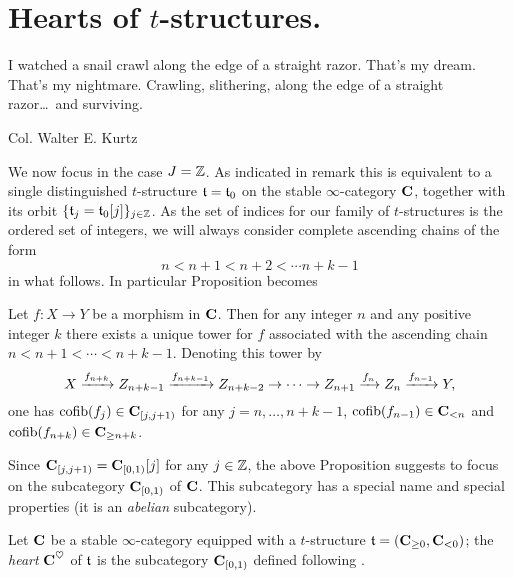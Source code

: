\section{Hearts of $t$\hyp{}structures.}
\setlength{\epigraphwidth}{.75\textwidth}
\epigraph{I watched a snail crawl along the edge of a straight razor. That's my dream. That's my nightmare. Crawling, slithering, along the edge of a straight razor\dots\ and surviving.
}{Col. Walter E. Kurtz}
\setlength{\epigraphwidth}{\DefaultEpigraphWidth}
We now focus in the case $J=\mathbb{Z} $. As indicated in remark  this is equivalent to a single distinguished $t$\hyp{}structure $\mathfrak{t}=\mathfrak{t}_0$ on the stable $\infty$\hyp{}category $\textbf{C}$, together with its orbit $\{\mathfrak{t}_j = \mathfrak{t}_0[j]\}_{j\in\mathbb{Z}}$. As the set of indices for our family of $t$\hyp{}structures is the ordered set of integers, we will always consider complete ascending chains of the form
\[
n<n+1<n+2<\cdots n+k-1
\]
in what follows. In particular Proposition  becomes
\begin{proposition}
Let $f\colon X\to Y$ be a morphism in $\textbf{C}$. Then for any integer $n$ and any positive integer $k$ there exists a unique tower for $f$ associated with the ascending chain $n<n+1<\cdots<n+k-1$. Denoting this tower by
\[
X \xrightarrow{f_{n+k}} Z_{n+k-1} \xrightarrow{f_{n+k-1}}Z_{n+k-2}\to\dots\to Z_{n+1} \xrightarrow{f_{n}} Z_{n} \xrightarrow{f_{n-1}} Y,
\]
one has
$\text{cofib}(f_j)\in \textbf{C}_{[j,j+1)}$ for any $j=n,\dots,n+k-1$,  $\text{cofib}(f_{n-1})\in \textbf{C}_{<n}$  and $\text{cofib}(f_{n+k})\in \textbf{C}_{\geq n+k}$.
\end{proposition}
Since $\textbf{C}_{[j,j+1)}=\textbf{C}_{[0,1)}[j]$ for any $j\in\mathbb{Z}$, the above Proposition suggests to focus on the subcategory $\textbf{C}_{[0,1)}$ of $\textbf{C}$. This subcategory has a special name and special properties (it is an \emph{abelian} subcategory).
\begin{definition}\label{coeur}
Let $\textbf{C}$ be a stable $\infty$\hyp{}category equipped with a $t$\hyp{}structure $\mathfrak{t}=(\textbf{C}_{\ge 0}, \textbf{C}_{<0})$; the \emph{heart} $\textbf{C}^\heartsuit$ of $\mathfrak{t}$ is the subcategory $\textbf{C}_{[0,1)}$ defined following \adef {}.
\end{definition}
